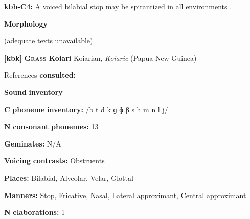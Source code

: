 \begin{styleBody}
\textbf{kbh-C4:} A voiced bilabial stop may be spirantized in all environments \citep[77]{Howard1967}.
\end{styleBody}

\begin{styleBody}
\textbf{Morphology}
\end{styleBody}

\begin{styleBody}
(adequate texts unavailable)
\end{styleBody}

\begin{styleBody}
\textbf{[kbk]}   \textbf{\textsc{Grass} \textbf{Koiari}}    Koiarian, \textit{Koiaric} (Papua New Guinea)
\end{styleBody}

\begin{styleBody}
References \textbf{consulted:} \citet{Dutton1996}
\end{styleBody}

\begin{styleBody}
\textbf{Sound} \textbf{inventory}
\end{styleBody}

\begin{styleBody}
\textbf{C} \textbf{phoneme} \textbf{inventory:} /b t d k ɡ ɸ β s h m n l j/
\end{styleBody}

\begin{styleBody}
\textbf{N} \textbf{consonant} \textbf{phonemes:} 13
\end{styleBody}

\begin{styleBody}
\textbf{Geminates:} N/A
\end{styleBody}

\begin{styleBody}
\textbf{Voicing} \textbf{contrasts:} Obstruents
\end{styleBody}

\begin{styleBody}
\textbf{Places:} Bilabial, Alveolar, Velar, Glottal
\end{styleBody}

\begin{styleBody}
\textbf{Manners:} Stop, Fricative, Nasal, Lateral approximant, Central approximant
\end{styleBody}

\begin{styleBody}
\textbf{N} \textbf{elaborations:} 1
\end{styleBody}


